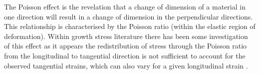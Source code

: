 The Poisson effect is the revelation that a change of dimension of a material
in one direction will result in a change of dimension in the perpendicular directions.
This relationship is characterised by the Poisson ratio (within the elastic
region of deformation). Within growth stress literature there has been some
investigation of this effect as it appears the redistribution of stress through
the Poisson ratio from the longitudinal to tangential direction is not
sufficient to account for the observed tangential strains, which can also vary
for a given longitudinal strain \cite{kubler_1987}.